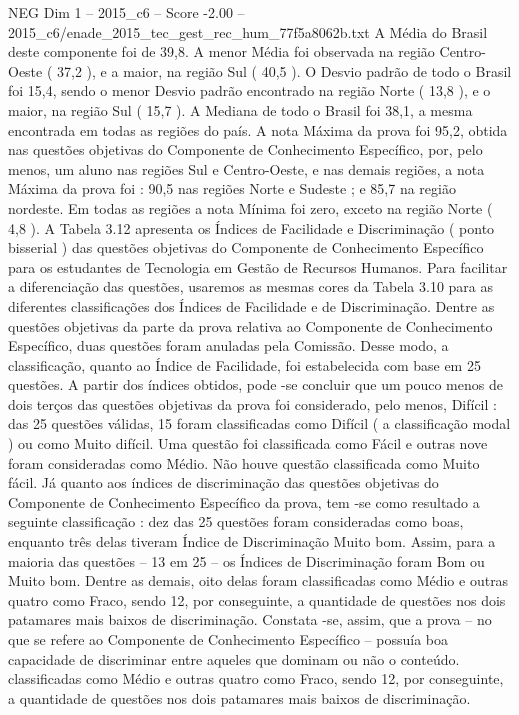 \begin{textsample}{NEG Dim 1 – 2015\_c6 – Score -2.00 – 2015\_c6/enade\_2015\_tec\_gest\_rec\_hum\_77f5a8062b.txt}
A Média do Brasil deste componente foi de 39,8.
A menor Média foi observada na região Centro-Oeste ( 37,2 ), e a maior, na região Sul ( 40,5 ).
O Desvio padrão de todo o Brasil foi 15,4, sendo o menor Desvio padrão encontrado na região Norte ( 13,8 ), e o maior, na região Sul ( 15,7 ).
A Mediana de todo o Brasil foi 38,1, a mesma encontrada em todas as regiões do país.
A nota Máxima da prova foi 95,2, obtida nas questões objetivas do Componente de Conhecimento Específico, por, pelo menos, um aluno nas regiões Sul e Centro-Oeste, e nas demais regiões, a nota Máxima da prova foi : 90,5 nas regiões Norte e Sudeste ; e 85,7 na região nordeste.
Em todas as regiões a nota Mínima foi zero, exceto na região Norte ( 4,8 ).
A Tabela 3.12 apresenta os Índices de Facilidade e Discriminação ( ponto bisserial ) das questões objetivas do Componente de Conhecimento Específico para os estudantes de Tecnologia em Gestão de Recursos Humanos.
Para facilitar a diferenciação das questões, usaremos as mesmas cores da Tabela 3.10 para as diferentes classificações dos Índices de Facilidade e de Discriminação.
Dentre as questões objetivas da parte da prova relativa ao Componente de Conhecimento Específico, duas questões foram anuladas pela Comissão.
Desse modo, a classificação, quanto ao Índice de Facilidade, foi estabelecida com base em 25 questões.
A partir dos índices obtidos, pode -se concluir que um pouco menos de dois terços das questões objetivas da prova foi considerado, pelo menos, Difícil : das 25 questões válidas, 15 foram classificadas como Difícil ( a classificação modal ) ou como Muito difícil.
Uma questão foi classificada como Fácil e outras nove foram consideradas como Médio.
Não houve questão classificada como Muito fácil.
Já quanto aos índices de discriminação das questões objetivas do Componente de Conhecimento Específico da prova, tem -se como resultado a seguinte classificação : dez das 25 questões foram consideradas como boas, enquanto três delas tiveram Índice de Discriminação Muito bom.
Assim, para a maioria das questões – 13 em 25 – os Índices de Discriminação foram Bom ou Muito bom.
Dentre as demais, oito delas foram classificadas como Médio e outras quatro como Fraco, sendo 12, por conseguinte, a quantidade de questões nos dois patamares mais baixos de discriminação.
Constata -se, assim, que a prova – no que se refere ao Componente de Conhecimento Específico – possuía boa capacidade de discriminar entre aqueles que dominam ou não o conteúdo. classificadas como Médio e outras quatro como Fraco, sendo 12, por conseguinte, a quantidade de questões nos dois patamares mais baixos de discriminação.

\end{textsample}
